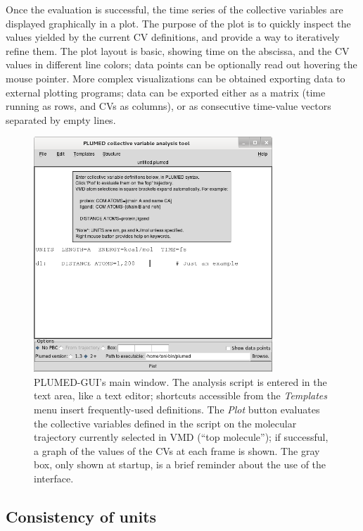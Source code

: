 \documentclass[preprint,12pt]{elsarticle}
\begin{document}
Once the evaluation is successful, the time series of the collective
variables are displayed graphically in a plot.  The purpose of the
plot is to quickly inspect the values yielded by the current CV
definitions, and provide a way to iteratively refine them. The plot
layout is basic, showing time on the abscissa, and the CV values in
different line colors; data points can be optionally read out hovering the
mouse pointer.  More complex visualizations can be obtained exporting
data to external plotting programs; data can be exported 
either as a matrix (time running as rows, and CVs as
columns), or as consecutive time-value vectors separated by empty
lines.




\begin{figure}
  \centering
  \includegraphics[width=0.8\textwidth]{images/main}
  \caption{PLUMED-GUI's main window.  The analysis script is entered
    in the text area, like a text editor; shortcuts accessible from
    the \emph{Templates} menu insert frequently-used definitions. The
    \emph{Plot} button evaluates the collective variables defined in
    the script on the molecular trajectory currently selected in VMD
    (``top molecule''); if successful, a graph of the values of the
    CVs at each frame is shown. The gray box, only shown at startup,
    is a brief reminder about the use of the interface.  }
  \label{fig:main}
\end{figure}




\subsection{Consistency of units}
\end{document}
